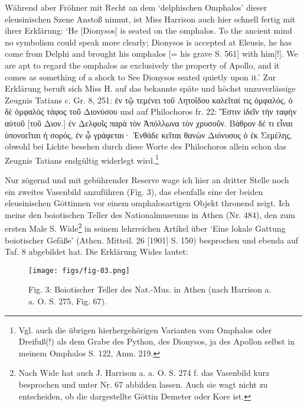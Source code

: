 \documentclass[a4paper, 11pt, oneside]{article}
\begin{document}
Während aber Fröhner mit Recht an dem `delphischen Omphalos' dieser eleusinischen Szene Anstoß nimmt, ist Miss Harrison auch hier schnell fertig mit ihrer Erklärung: `He [Dionysos] is seated on the omphalos. To the ancient mind no symbolism could speak more clearly; Dionysos is accepted at Eleusis, he has come from Delphi and brought his omphalos [= his grave S. 561] with him[!]. We are apt to regard the omphalos as exclusively the property of Apollo, and it comes as something of a shock to See Dionysos seated quietly upon it.' Zur Erklärung beruft sich Miss H. auf das bekannte späte und höchst unzuverlässige Zeugnis Tatians c. Gr. 8, 251: ἐν τῷ τεμένει τοῦ Λητοΐδου καλεῖταί τις ὀμφαλός, ὁ δὲ ὀμφαλὸς τάφος τοῦ Διονύσου und auf Philochoros fr. 22: Ἔστιν ἰδεῖν τὴν ταφὴν αὐτοῦ [τοῦ Διον.] ἐν Δελφοῖς παρὰ τὸν Ἀπόλλωνα τὸν χρυσοῦν. Βάθρον δέ τι εἶναι ὑπονοεῖται ἡ σορός, ἐν ᾧ γράφεται· Ἐνθάδε κεῖται θανὼν Διόνυσος ὁ ἐκ Σεμέλης, obwohl bei Lichte besehen durch diese Worte des Philochoros allein schon das Zeugnis Tatians endgültig widerlegt wird.\footnote{Vgl. auch die übrigen hierhergehörigen Varianten vom Omphalos oder Dreifuß(!) als dem Grabe des Python, des Dionysos, ja des Apollon selbst in meinem Omphalos S. 122, Anm. 219.}

Nur zögernd und mit gebührender Reserve wage ich hier an dritter Stelle noch ein zweites Vasenbild anzuführen (Fig. 3), das ebenfalls eine der beiden eleusinischen Göttinnen vor einem omphalosartigen Objekt thronend zeigt. Ich meine den boiotischen Teller des Nationalmuseums in Athen (Nr. 484), den zum ersten Male S. Wide\footnote{Nach Wide hat auch J. Harrison a. a. O. S. 274 f. das Vasenbild kurz besprochen und unter Nr. 67 abbilden lassen. Auch sie wagt nicht zu entscheiden, ob die dargestellte Göttin Demeter oder Kore ist.} in seinem lehrreichen Artikel über `Eine lokale Gattung boiotischer Gefäße' (Athen. Mitteil. 26 [1901] S. 150) besprochen und ebenda auf Taf. 8 abgebildet hat. Die Erklärung Wides lautet:

\begin{figure}[H]
\centering
\texttt{[image: figs/fig-03.png]}
\caption{Fig. 3: Boiotischer Teller des Nat.-Mus. in Athen (nach Harrison a. a. O. S. 275, Fig. 67).}
\end{figure}
\end{document}
